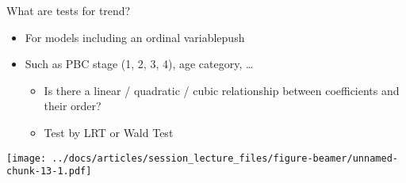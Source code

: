 \documentclass[
  ignorenonframetext,
]{beamer}
\providecommand{\tightlist}{%
  \setlength{\itemsep}{0pt}\setlength{\parskip}{0pt}}
\begin{document}
\begin{frame}{What are tests for trend?}
\protect\hypertarget{what-are-tests-for-trend}{}

\begin{itemize}
\tightlist
\item
  For models including an ordinal variablepush
\item
  Such as PBC stage (1, 2, 3, 4), age category, \ldots{}

  \begin{itemize}
  \tightlist
  \item
    Is there a linear / quadratic / cubic relationship between
    coefficients and their order?
  \item
    Test by LRT or Wald Test
  \end{itemize}
\end{itemize}

\texttt{[image: ../docs/articles/session\_lecture\_files/figure-beamer/unnamed-chunk-13-1.pdf]}

\end{frame}
\end{document}
